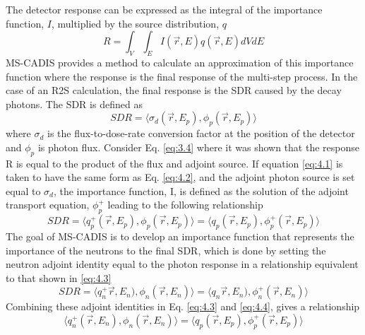 The detector response can be
expressed as the integral of the importance function, $I$, multiplied by the source
distribution, $q$
\begin{equation} \label{eq:4.1}
R = \int_{V}\int_{E} 
    I(\overrightarrow{r}, E)
    q(\overrightarrow{r}, E)
    dV dE
\end{equation}
MS-CADIS provides a method to calculate an approximation of this importance function
where the response is the final response of the multi-step process.  In the case
of an R2S calculation, the final response is the SDR caused by the decay
photons.  The SDR is defined as 
\begin{equation} \label{eq:4.2}
  SDR =  \langle \sigma_{d}(\overrightarrow{r},E_{p}),
  \phi_{p}(\overrightarrow{r}, E_{p}) \rangle
\end{equation}
where $\sigma_{d}$ is the flux-to-dose-rate conversion factor at the position of
the detector and $\phi_{p}$ is photon flux.
Consider Eq. \ref{eq:3.4} where it was shown that the response R is
equal to the product of the flux and adjoint source.  
If equation \ref{eq:4.1}
is taken to have the same form as Eq. \ref{eq:4.2}, and the adjoint photon
source is set equal to $\sigma_d$, the importance function, I,
is defined as the solution of the adjoint transport equation, $\phi_{p}^{+}$
leading to the following relationship
\begin{equation} \label{eq:4.3}
	SDR =  \langle q_{p}^{+}(\overrightarrow{r},E_{p}),
  \phi_{p}(\overrightarrow{r}, E_{p}) \rangle 
	= \langle q_{p}(\overrightarrow{r},E_{p}),
  \phi_{p}^{+}(\overrightarrow{r}, E_{p}) \rangle 
\end{equation}
The goal of MS-CADIS is to develop an importance function that represents the
importance of the neutrons to the final SDR, which is done by setting the
neutron adjoint identity equal to the photon response in a relationship
equivalent to that shown in \ref{eq:4.3}
\begin{equation} \label{eq:4.4}
  SDR =  \langle q_{n}^{+}\overrightarrow{r},E_{n}),
  \phi_{n}(\overrightarrow{r}, E_{n}) \rangle 
  = \langle q_{n}\overrightarrow{r},E_{n}),
  \phi_{n}^{+}(\overrightarrow{r}, E_{n}) \rangle 
\end{equation}
Combining these adjoint identities in Eq. \ref{eq:4.3} and \ref{eq:4.4}, 
gives a relationship
\begin{equation} \label{eq:4.5}
	\langle q_{n}^{+}(\overrightarrow{r},E_{n}),
  \phi_{n}(\overrightarrow{r}, E_{n}) \rangle 
	= \langle q_{p}(\overrightarrow{r},E_{p}),
  \phi_{p}^{+}(\overrightarrow{r}, E_{p}) \rangle 
\end{equation}

